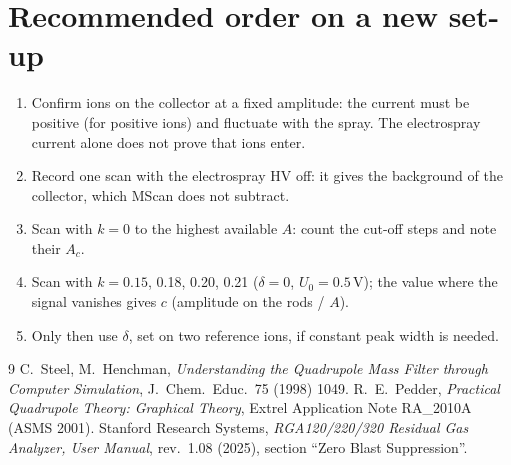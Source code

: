 \documentclass[10pt,a4paper]{article}
\begin{document}
\section{Recommended order on a new set-up}
\begin{enumerate}
\item Confirm ions on the collector at a fixed amplitude: the current must be positive (for positive
  ions) and fluctuate with the spray. The electrospray current alone does not prove that ions enter.
\item Record one scan with the electrospray HV off: it gives the background of the collector, which
  MScan does not subtract.
\item Scan with $k=0$ to the highest available $A$: count the cut-off steps and note their $A_c$.
\item Scan with $k=0.15$, 0.18, 0.20, 0.21 ($\delta=0$, $U_0=0.5$\,V); the value where the signal
  vanishes gives $c$ (amplitude on the rods / $A$).
\item Only then use $\delta$, set on two reference ions, if constant peak width is needed.
\end{enumerate}

\begin{thebibliography}{9}\small
{} C.~Steel, M.~Henchman, \emph{Understanding the Quadrupole Mass Filter through Computer
Simulation}, J.\ Chem.\ Educ.\ 75 (1998) 1049.
 R.~E.~Pedder, \emph{Practical Quadrupole Theory: Graphical Theory}, Extrel
Application Note RA\_2010A (ASMS 2001).
 Stanford Research Systems, \emph{RGA120/220/320 Residual Gas Analyzer, User Manual},
rev.\ 1.08 (2025), section ``Zero Blast Suppression''.
\end{thebibliography}
\end{document}
